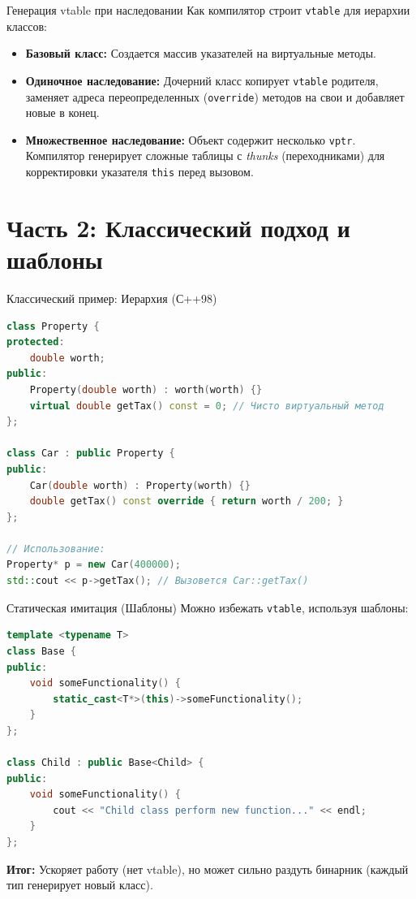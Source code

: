 \documentclass[10pt, aspectratio=169]{beamer}
\begin{document}
\begin{frame}{Генерация vtable при наследовании}
    Как компилятор строит \texttt{vtable} для иерархии классов:
    \begin{itemize}
        \item \textbf{Базовый класс:} Создается массив указателей на виртуальные методы.
        \item \textbf{Одиночное наследование:} Дочерний класс копирует \texttt{vtable} родителя, заменяет адреса переопределенных (\texttt{override}) методов на свои и добавляет новые в конец.
        \item \textbf{Множественное наследование:} Объект содержит несколько \texttt{vptr}. Компилятор генерирует сложные таблицы с \textit{thunks} (переходниками) для корректировки указателя \texttt{this} перед вызовом.
    \end{itemize}
\end{frame}

\section{Часть 2: Классический подход и шаблоны}

\begin{frame}[fragile]{Классический пример: Иерархия (С++98)}
\begin{lstlisting}[language=C++]
class Property {
protected:
    double worth;
public:
    Property(double worth) : worth(worth) {}
    virtual double getTax() const = 0; // Чисто виртуальный метод
};

class Car : public Property {
public:
    Car(double worth) : Property(worth) {}
    double getTax() const override { return worth / 200; }
};

// Использование:
Property* p = new Car(400000);
std::cout << p->getTax(); // Вызовется Car::getTax()
\end{lstlisting}
\end{frame}

\begin{frame}[fragile]{Статическая имитация (Шаблоны)}
Можно избежать \texttt{vtable}, используя шаблоны:
\begin{lstlisting}[language=C++]
template <typename T>
class Base {
public:
    void someFunctionality() {
        static_cast<T*>(this)->someFunctionality();
    }
};

class Child : public Base<Child> {
public:
    void someFunctionality() {
        cout << "Child class perform new function..." << endl;
    }
};
\end{lstlisting}
    \textbf{Итог:} Ускоряет работу (нет vtable), но может сильно раздуть бинарник (каждый тип генерирует новый класс).
\end{frame}
\end{document}
